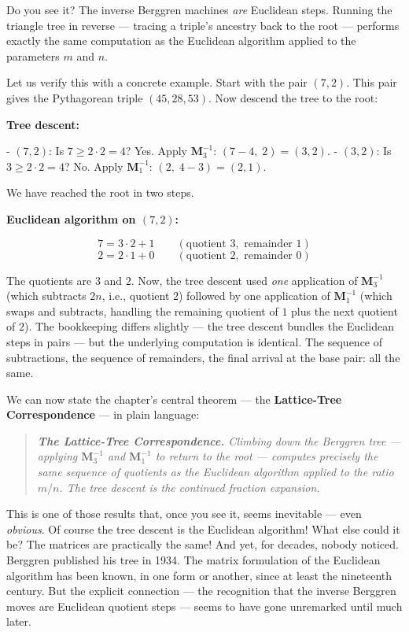 Do you see it? The inverse Berggren machines \textit{are} Euclidean steps. Running the triangle tree in reverse --- tracing a triple's ancestry back to the root --- performs exactly the same computation as the Euclidean algorithm applied to the parameters $m$ and $n$.

Let us verify this with a concrete example. Start with the pair $(7, 2)$. This pair gives the Pythagorean triple $(45, 28, 53)$. Now descend the tree to the root:

\textbf{Tree descent:}

- $(7, 2)$: Is $7 \ge 2 \cdot 2 = 4$? Yes. Apply $\mathbf{M}_3^{-1}$: $(7 - 4,\; 2) = (3, 2)$.
- $(3, 2)$: Is $3 \ge 2 \cdot 2 = 4$? No. Apply $\mathbf{M}_1^{-1}$: $(2,\; 4 - 3) = (2, 1)$.

We have reached the root in two steps.

\textbf{Euclidean algorithm on $(7, 2)$:}

\[
7 = 3 \cdot 2 + 1 \qquad (\text{quotient } 3, \text{ remainder } 1)\]
\[
2 = 2 \cdot 1 + 0 \qquad (\text{quotient } 2, \text{ remainder } 0)\]

The quotients are $3$ and $2$. Now, the tree descent used \textit{one} application of $\mathbf{M}_3^{-1}$ (which subtracts $2n$, i.e., quotient $2$) followed by one application of $\mathbf{M}_1^{-1}$ (which swaps and subtracts, handling the remaining quotient of $1$ plus the next quotient of $2$). The bookkeeping differs slightly --- the tree descent bundles the Euclidean steps in pairs --- but the underlying computation is identical. The sequence of subtractions, the sequence of remainders, the final arrival at the base pair: all the same.


We can now state the chapter's central theorem --- the \textbf{Lattice-Tree Correspondence} --- in plain language:


\begin{quote}
\itshape
\textbf{The Lattice-Tree Correspondence.} \textit{Climbing down the Berggren tree --- applying $\mathbf{M}_3^{-1}$ and $\mathbf{M}_1^{-1}$ to return to the root --- computes precisely the same sequence of quotients as the Euclidean algorithm applied to the ratio $m/n$. The tree descent} is \textit{the continued fraction expansion.}
\end{quote}


This is one of those results that, once you see it, seems inevitable --- even \textit{obvious}. Of course the tree descent is the Euclidean algorithm! What else could it be? The matrices are practically the same! And yet, for decades, nobody noticed. Berggren published his tree in 1934. The matrix formulation of the Euclidean algorithm has been known, in one form or another, since at least the nineteenth century. But the explicit connection --- the recognition that the inverse Berggren moves are Euclidean quotient steps --- seems to have gone unremarked until much later.

